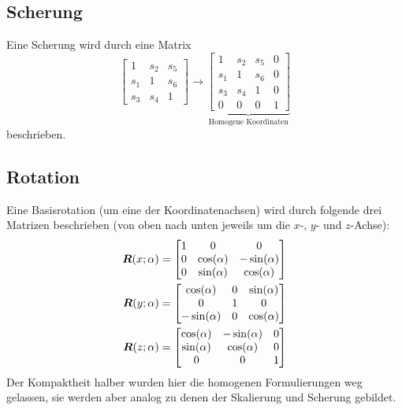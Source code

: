 			\subsection{Scherung}
				Eine Scherung wird durch eine Matrix
				\begin{equation*}
					\begin{bmatrix}
						1   & s_2 & s_5 \\
						s_1 & 1   & s_6 \\
						s_3 & s_4 & 1
					\end{bmatrix}
					\to
					\underbrace{
						\begin{bmatrix}
							1   & s_2 & s_5 & 0 \\
							s_1 & 1   & s_6 & 0 \\
							s_3 & s_4 & 1   & 0 \\
							0   & 0   & 0   & 1
						\end{bmatrix}
					}_\text{Homogene Koordinaten}
				\end{equation*}
				beschrieben.

			\subsection{Rotation}
				Eine Basisrotation (um eine der Koordinatenachsen) wird durch folgende drei Matrizen beschrieben (von oben nach unten jeweils um die \(x\)-, \(y\)- und \(z\)-Achse):
				\begin{align*}
					\bm{R}(x; \alpha) & =
					\begin{bmatrix}
						1 & 0            & 0             \\
						0 & \cos(\alpha) & -\sin(\alpha) \\
						0 & \sin(\alpha) & \cos(\alpha)
					\end{bmatrix} \\
					\bm{R}(y; \alpha) & =
					\begin{bmatrix}
						\cos(\alpha)  & 0 & \sin(\alpha) \\
						0             & 1 & 0            \\
						-\sin(\alpha) & 0 & \cos(\alpha)
					\end{bmatrix} \\
					\bm{R}(z; \alpha) & =
					\begin{bmatrix}
						\cos(\alpha) & -\sin(\alpha) & 0 \\
						\sin(\alpha) & \cos(\alpha)  & 0 \\
						0            & 0             & 1
					\end{bmatrix}
				\end{align*}
				Der Kompaktheit halber wurden hier die homogenen Formulierungen weg gelassen, sie werden aber analog zu denen der Skalierung und Scherung gebildet.

